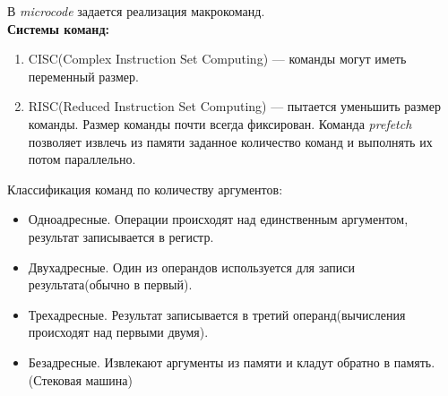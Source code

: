 В \textit{microcode} задается реализация макрокоманд.
\\

\textbf{Системы команд:}
\begin{enumerate}
\item CISC(Complex Instruction Set Computing) --- команды могут иметь переменный размер.
\item RISC(Reduced Instruction Set Computing) --- пытается уменьшить размер команды. Размер команды почти всегда фиксирован. Команда \textit{prefetch} позволяет извлечь из памяти заданное количество команд и выполнять их потом параллельно.
\end{enumerate}

Классификация команд по количеству аргументов:
\begin{itemize}
\item Одноадресные. Операции происходят над единственным аргументом, результат записывается в регистр.
\item Двухадресные. Один из операндов используется для записи результата(обычно в первый).
\item Трехадресные. Результат записывается в третий операнд(вычисления происходят над первыми двумя).
\item Безадресные. Извлекают аргументы из памяти и кладут обратно в память. (Стековая машина)
\end{itemize}
